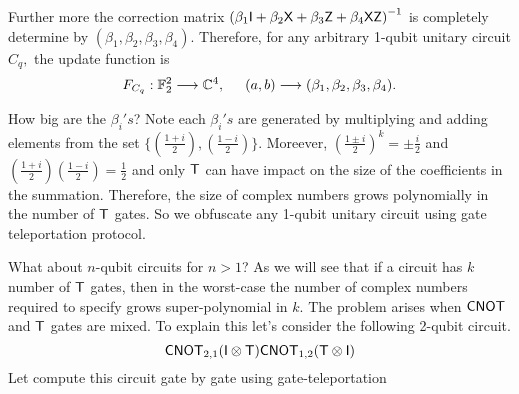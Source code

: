 Further more the correction matrix $\left(\beta_1 {\sf I}+\beta_2 {\sf X}+\beta_3 {\sf Z}+\beta_4 {\sf X} {\sf Z}\right)^{-1}$  is completely determine by $(\beta_1, \beta_2, \beta_3, \beta_4).$ Therefore, for any arbitrary 1-qubit unitary circuit $C_q,$ the update function is $$F_{C_q}: \mathbb{F}_2^2 \longrightarrow \mathbb{C}^4,\hspace{0.5cm} (a,b)\longrightarrow (\beta_1,\beta_2,\beta_3, \beta_4).$$

% 
% 
 

How big  are the $\beta_i's $? Note each $\beta_i's$ are generated by multiplying and adding elements from the set $\{\left(\frac{1+i}{2}\right), \left(\frac{1-i}{2}\right)\}.$ Moreever, $\left(\frac{1\pm i}{2}\right)^k=\pm \frac{i}{2}$ and
$\left(\frac{1+ i}{2}\right)\left(\frac{1- i}{2}\right)=\frac{1}{2}$ and only ${\sf T}$ can have impact on the size of the coefficients in the summation. Therefore, the size of complex numbers grows polynomially in the number of ${\sf T}$ gates. 
So we obfuscate any 1-qubit unitary circuit using gate teleportation protocol. 

What about $n$-qubit circuits for $n>1$? As we will see that if a circuit has $k$ number of ${\sf T}$ gates, then in the worst-case the number of complex numbers required to specify grows super-polynomial in $k.$ The problem arises when ${\sf CNOT}$ and ${\sf T}$ gates are mixed. To explain this let's consider the following 2-qubit circuit.
$${\sf CNOT}_{2,1}({\sf I}\otimes {\sf T}){\sf CNOT}_{1,2}({\sf T}\otimes {\sf I})$$
Let compute this circuit gate by gate using gate-teleportation

